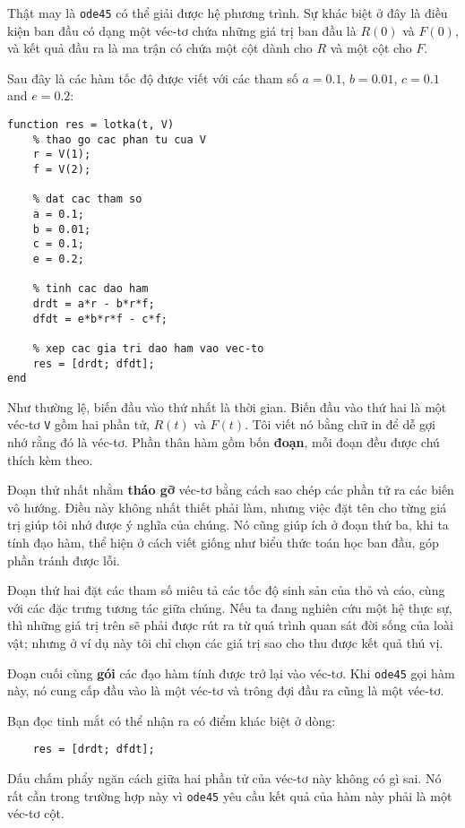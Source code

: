 \documentclass[12pt]{book}
\begin{document}
Thật may là {\tt ode45} có thể giải được hệ phương trình. Sự
khác biệt ở đây là điều kiện ban đầu có dạng một véc-tơ chứa
những giá trị ban đầu là $R(0)$ và $F(0)$, và kết quả đầu ra là
ma trận có chứa một cột dành cho $R$ và một cột cho $F$.

Sau đây là các hàm tốc độ được viết với các tham số
$a = 0.1$, $b = 0.01$, $c = 0.1$ and $e = 0.2$:

\begin{verbatim}
function res = lotka(t, V)
    % thao go cac phan tu cua V
    r = V(1);
    f = V(2);

    % dat cac tham so
    a = 0.1;
    b = 0.01;
    c = 0.1;
    e = 0.2;
    
    % tinh cac dao ham
    drdt = a*r - b*r*f;
    dfdt = e*b*r*f - c*f;
    
    % xep cac gia tri dao ham vao vec-to
    res = [drdt; dfdt];
end
\end{verbatim}
%
Như thường lệ, biến đầu vào thứ nhất là thời gian. 
Biến đầu vào thứ hai là một véc-tơ {\tt V} gồm hai phần tử,
$R(t)$ và $F(t)$. Tôi viết nó bằng chữ in để dễ gợi nhớ
rằng đó là véc-tơ. Phần thân hàm gồm bốn {\bf đoạn},
mỗi đoạn đều được chú thích kèm theo.

Đoạn thử nhất nhằm {\bf tháo gỡ} véc-tơ bằng cách sao chép
các phần tử ra các biến vô hướng. Điều này không nhất thiết phải làm,
nhưng việc đặt tên cho từng giá trị giúp tôi nhớ được ý nghĩa của chúng.
Nó cũng giúp ích ở đoạn thứ ba, khi ta tính đạo hàm, thể hiện ở 
cách viết giống như biểu thức toán học ban đầu, góp phần tránh được lỗi.

Đoạn thứ hai đặt các tham số miêu tả các tốc độ sinh sản của
thỏ và cáo, cùng với các đặc trưng tương tác giữa chúng. Nếu ta
đang nghiên cứu một hệ thực sự, thì những giá trị trên sẽ phải 
được rút ra từ quá trình quan sát đời sống của loài vật; nhưng ở
ví dụ này tôi chỉ chọn các giá trị sao cho thu được kết quả thú vị.

Đoạn cuối cùng {\bf gói} các đạo hàm tính được trở lại vào véc-tơ.
Khi {\tt ode45} gọi hàm này, nó cung cấp đầu vào là một véc-tơ
và trông đợi đầu ra cũng là một véc-tơ.

Bạn đọc tinh mắt có thể nhận ra có điểm khác biệt ở dòng:

\begin{verbatim}
    res = [drdt; dfdt];
\end{verbatim}

Dấu chấm phẩy ngăn cách giữa hai phần tử của véc-tơ này không có gì sai.
Nó rất cần trong trường hợp này vì {\tt ode45} yêu cầu kết quả của hàm
này phải là một véc-tơ cột.
\end{document}
